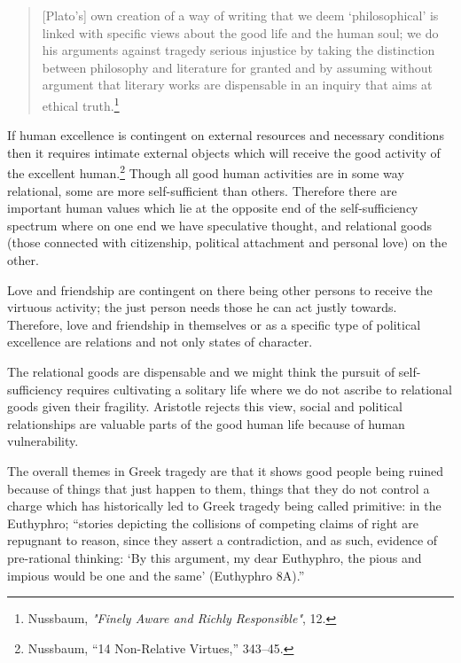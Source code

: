 \documentclass[
  12pt,
]{book}
\theoremstyle{definition}
\theoremstyle{definition}
\theoremstyle{definition}
\theoremstyle{definition}
\theoremstyle{remark}
\begin{document}
\begin{quote}
{[}Plato's{]} own creation of a way of writing that we deem `philosophical' is linked with specific views about the good life and the human soul; we do his arguments against tragedy serious injustice by taking the distinction between philosophy and literature for granted and by assuming without argument that literary works are dispensable in an inquiry that aims at ethical truth.\footnote{Nussbaum, \emph{"{Finely Aware} and {Richly Responsible}"}, 12.}
\end{quote}

If human excellence is contingent on external resources and necessary conditions then it requires intimate external objects which will receive the good activity of the excellent human.\footnote{Nussbaum, {``14 {Non-Relative Virtues},''} 343--45.} Though all good human activities are in some way relational, some are more self-sufficient than others. Therefore there are important human values which lie at the opposite end of the self-sufficiency spectrum where on one end we have speculative thought, and relational goods (those connected with citizenship, political attachment and personal love) on the other.

Love and friendship are contingent on there being other persons to receive the virtuous activity; the just person needs those he can act justly towards. Therefore, love and friendship in themselves or as a specific type of political excellence are relations and not only states of character.

The relational goods are dispensable and we might think the pursuit of self-sufficiency requires cultivating a solitary life where we do not ascribe to relational goods given their fragility. Aristotle rejects this view, social and political relationships are valuable parts of the good human life because of human vulnerability.

The overall themes in Greek tragedy are that it shows good people being ruined because of things that just happen to them, things that they do not control a charge which has historically led to Greek tragedy being called primitive: in the Euthyphro; ``stories depicting the collisions of competing claims of right are repugnant to reason, since they assert a contradiction, and as such, evidence of pre-rational thinking: `By this argument, my dear Euthyphro, the pious and impious would be one and the same' (Euthyphro 8A).''
\end{document}
